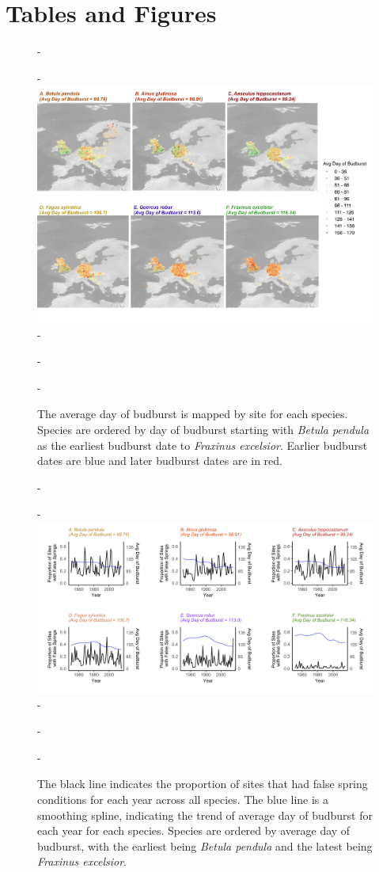 \documentclass{article}\usepackage[]{graphicx}\usepackage[]{color}
\begin{document}


\section*{Tables and Figures} %

{\begin{figure} [H]
  -\begin{center}
  -\includegraphics[width=14cm]{..//figures/BB_gis.pdf}
  -\caption{The average day of budburst is mapped by site for each species. Species are ordered by day of budburst starting with \textit{Betula pendula} as the earliest budburst date to \textit{Fraxinus excelsior}. Earlier budburst dates are blue and later budburst dates are in red. }\label{fig:bbmap}
  -\end{center}
  -\end{figure}}
  
{\begin{figure} [H]
  -\begin{center}
  -\includegraphics[width=16cm]{..//figures/PropSitesbyYrwBB.png}
  -\caption{The black line indicates the proportion of sites that had false spring conditions for each year across all species. The blue line is a smoothing spline, indicating the trend of average day of budburst for each year for each species. Species are ordered by average day of budburst, with the earliest being \textit{Betula pendula} and the latest being \textit{Fraxinus excelsior}.}\label{fig:fsprop}
  -\end{center}
  -\end{figure}}
  
\end{document}
